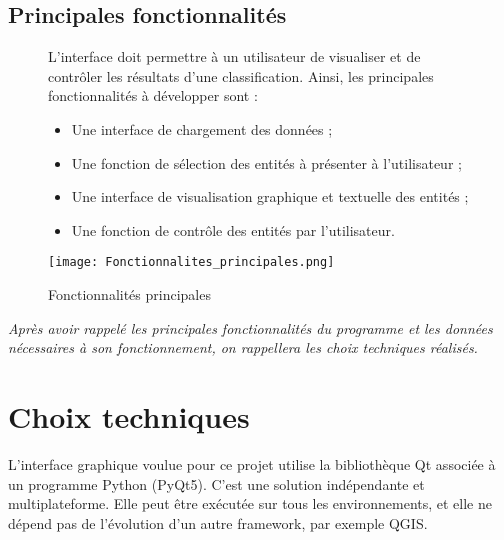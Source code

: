 \subsection{Principales fonctionnalités}

\begin{figure}[!h]
	\begin{minipage}{0.50\linewidth}\parindent12pt
		 \indent L'interface doit permettre à un utilisateur de visualiser et de contrôler les résultats d'une classification. Ainsi, les principales fonctionnalités à développer sont :\\
		\begin{itemize}[label=$\rightarrow$]
			\item Une interface de chargement des données ;
			\item Une fonction de sélection des entités à présenter à l'utilisateur ;
			\item Une interface de visualisation graphique et textuelle des entités ;
			\item Une fonction de contrôle des entités par l'utilisateur.
		\end{itemize}
	\end{minipage}
\hfill
	\begin{minipage}{0.45\linewidth}
		\centering
		\texttt{[image: Fonctionnalites\_principales.png]}  \\
		\caption[Fonctionnalités principales]{Fonctionnalités principales}
		\label{fig:fonctionnalitesprinc}
	\end{minipage}
\end{figure}

\textit{Après avoir rappelé les principales fonctionnalités du programme et les données nécessaires à son fonctionnement, on rappellera les choix techniques réalisés.}

\section{Choix techniques}

L’interface graphique voulue pour ce projet utilise la bibliothèque Qt associée à un programme Python (PyQt5). C'est une solution indépendante et multiplateforme. Elle peut être exécutée sur tous les environnements, et elle ne dépend pas de l'évolution d'un autre framework, par exemple QGIS.